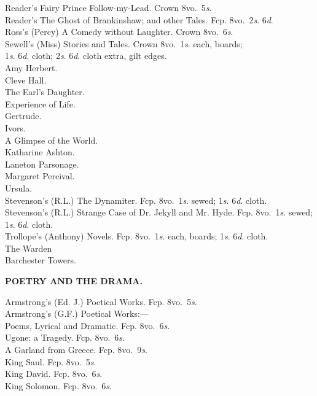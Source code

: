 \documentclass[letterpaper,12pt,oneside,openany]{memoir}
\newcommand{\D}{\hspace*{5mm}}
\begin{document}
\begin{footnotesize}
Reader's Fairy Prince Follow-my-Lead. Crown 8vo.\ 5\textit{s}.\\
Reader's The Ghost of Brankinshaw; and other Tales. Fcp. 8vo.\ 2\textit{s}. 6\textit{d}.\\
Ross's (Percy) A Comedy without Laughter. Crown 8vo.\ 6\textit{s}.\\
Sewell's (Miss) Stories and Tales. Crown 8vo.\ 1\textit{s}. each, boards; \\
\D 1\textit{s}. 6\textit{d}. cloth; 2\textit{s}. 6\textit{d}. cloth extra, gilt edges.\\
\D Amy Herbert.\\
\D Cleve Hall.\\
\D The Earl's Daughter.\\
\D Experience of Life.\\
\D Gertrude.\\
\D Ivors.\\
\D A Glimpse of the World.\\
\D Katharine Ashton.\\
\D Laneton Parsonage.\\
\D Margaret Percival.\\
\D Ursula.\\
Stevenson's (R.L.) The Dynamiter. Fcp. 8vo.\ 1\textit{s}. sewed; 1\textit{s}. 6\textit{d}. cloth.\\
Stevenson's (R.L.) Strange Case of Dr. Jekyll and Mr. Hyde. Fcp. 8vo.\ 1\textit{s}. sewed; 1\textit{s}. 6\textit{d}. cloth.\\
Trollope's (Anthony) Novels. Fcp. 8vo.\ 1\textit{s}. each, boards; 1\textit{s}. 6\textit{d}. cloth.\\
\D The Warden\\
\D Barchester Towers.
\begin{center}
\textbf{POETRY AND THE DRAMA.}
\end{center}
Armstrong's (Ed. J.) Poetical Works. Fcp. 8vo.\ 5\textit{s}.\\
Armstrong's (G.F.) Poetical Works:---\\
\D Poems, Lyrical and Dramatic. Fcp. 8vo.\ 6\textit{s}.\\
\D Ugone: a Tragedy. Fcp. 8vo.\ 6\textit{s}.\\
\D A Garland from Greece. Fcp. 8vo.\ 9\textit{s}.\\
\D King Saul. Fcp. 8vo.\ 5\textit{s}.\\
\D King David. Fcp. 8vo.\ 6\textit{s}.\\
\D King Solomon. Fcp. 8vo.\ 6\textit{s}.\\

\end{footnotesize}
\end{document}
